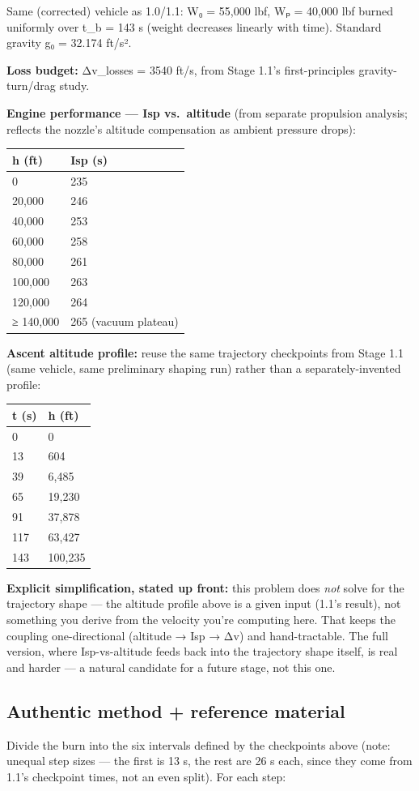 \documentclass[
  10pt,
]{article}
\begin{document}
Same (corrected) vehicle as 1.0/1.1: W₀ = 55,000 lbf, Wₚ = 40,000 lbf
burned uniformly over t\_b = 143 s (weight decreases linearly with
time). Standard gravity g₀ = 32.174 ft/s².

\textbf{Loss budget:} Δv\_losses = 3540 ft/s, from Stage 1.1's
first-principles gravity-turn/drag study.

\textbf{Engine performance --- Isp vs.~altitude} (from separate
propulsion analysis; reflects the nozzle's altitude compensation as
ambient pressure drops):

\begin{longtable}[]{@{}ll@{}}
\toprule
h (ft) & Isp (s)\tabularnewline
\midrule
\endhead
0 & 235\tabularnewline
20,000 & 246\tabularnewline
40,000 & 253\tabularnewline
60,000 & 258\tabularnewline
80,000 & 261\tabularnewline
100,000 & 263\tabularnewline
120,000 & 264\tabularnewline
≥ 140,000 & 265 (vacuum plateau)\tabularnewline
\bottomrule
\end{longtable}

\textbf{Ascent altitude profile:} reuse the same trajectory checkpoints
from Stage 1.1 (same vehicle, same preliminary shaping run) rather than
a separately-invented profile:

\begin{longtable}[]{@{}ll@{}}
\toprule
t (s) & h (ft)\tabularnewline
\midrule
\endhead
0 & 0\tabularnewline
13 & 604\tabularnewline
39 & 6,485\tabularnewline
65 & 19,230\tabularnewline
91 & 37,878\tabularnewline
117 & 63,427\tabularnewline
143 & 100,235\tabularnewline
\bottomrule
\end{longtable}

\textbf{Explicit simplification, stated up front:} this problem does
\emph{not} solve for the trajectory shape --- the altitude profile above
is a given input (1.1's result), not something you derive from the
velocity you're computing here. That keeps the coupling one-directional
(altitude → Isp → Δv) and hand-tractable. The full version, where
Isp-vs-altitude feeds back into the trajectory shape itself, is real and
harder --- a natural candidate for a future stage, not this one.

\hypertarget{authentic-method-reference-material}{%
\subsection{Authentic method + reference
material}\label{authentic-method-reference-material}}

Divide the burn into the six intervals defined by the checkpoints above
(note: unequal step sizes --- the first is 13 s, the rest are 26 s each,
since they come from 1.1's checkpoint times, not an even split). For
each step:
\end{document}
